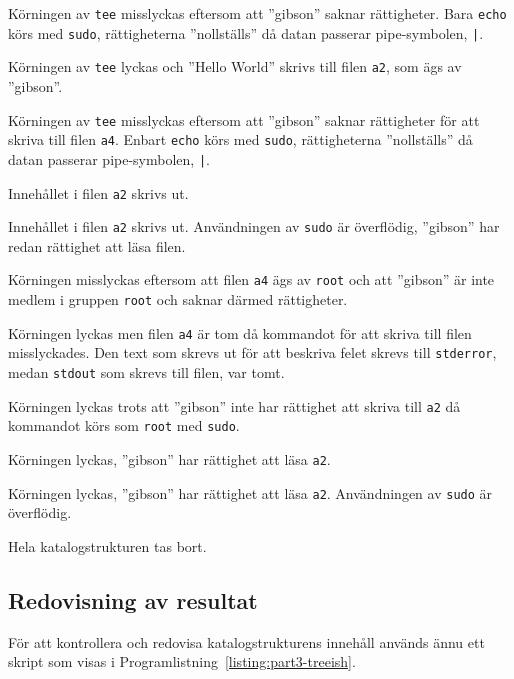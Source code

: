              {Körningen av \texttt{tee} misslyckas eftersom att ''gibson''
              saknar rättigheter. Bara \texttt{echo} körs med \texttt{sudo},
              rättigheterna ''nollställs'' då datan passerar pipe-symbolen,
              \texttt{|}.}

             {Körningen av \texttt{tee} lyckas och ''Hello World'' skrivs
              till filen \texttt{a2}, som ägs av ''gibson''.}

             {Körningen av \texttt{tee} misslyckas eftersom att ''gibson''
              saknar rättigheter för att skriva till filen \texttt{a4}. 
              Enbart \texttt{echo} körs med \texttt{sudo}, rättigheterna
              ''nollställs'' då datan passerar pipe-symbolen, \texttt{|}.}

             {Innehållet i filen \texttt{a2} skrivs ut.}

             {Innehållet i filen \texttt{a2} skrivs ut. Användningen av
              \texttt{sudo} är överflödig, ''gibson'' har redan rättighet att
              läsa filen.}

             {Körningen misslyckas eftersom att filen \texttt{a4} ägs av
              \texttt{root} och att ''gibson'' är inte medlem i gruppen 
              \texttt{root} och saknar därmed rättigheter.}

             {Körningen lyckas men filen \texttt{a4} är tom då kommandot för
              att skriva till filen misslyckades. Den text som skrevs ut för
              att beskriva felet skrevs till \texttt{stderror}, medan 
              \texttt{stdout} som skrevs till filen, var tomt.}

             {Körningen lyckas trots att ''gibson'' inte har rättighet att
              skriva till \texttt{a2} då kommandot körs som \texttt{root} med
              \texttt{sudo}.}

             {Körningen lyckas, ''gibson'' har rättighet att läsa \texttt{a2}.}

             {Körningen lyckas, ''gibson'' har rättighet att läsa \texttt{a2}.
              Användningen av \texttt{sudo} är överflödig.}

             {Hela katalogstrukturen tas bort.}

\subsection{Redovisning av resultat}
För att kontrollera och redovisa katalogstrukturens innehåll används ännu ett
skript som visas i Programlistning~\ref{listing:part3-treeish}.

